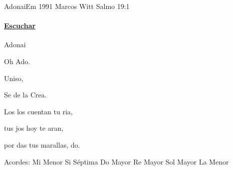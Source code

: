 \documentclass[12pt, spanish]{book}
\newcommand{\NotCCLIed}{\relax}
\begin{document}
    \begin{song}{Adonai}{Em}
    {1991} %
    {Marcos Witt}
    {Salmo 19:1} %
    {} %
        \ifChordBk
        \paragraph{\mbox{}\hfill\protect\href{https://open.spotify.com/intl-es/track/30njp3rQZ90oJTPoQj4RLt}{Escuchar}\mbox{}\hfill}
        \fi


        \begin{SBChorus}
             Adonai

            Oh Ado.

              Uniso,

            Se de la Crea.
        \end{SBChorus}

        \begin{SBOpGroup}
            Los los cuentan tu ria,

            tus jos hoy te aran,

            por das tus marallas, do.
        \end{SBOpGroup}

        \ifChordBk
        \begin{SBOpGroup}
            Acordes:
            \upchord{\Em}\qquad Mi Menor \hfill
            \upchord{\Bseven}\qquad Si S\'eptima \hfill\null\break
            \upchord{\C}\qquad Do Mayor \hfill
            \upchord{\D}Re Mayor \hfill\null\break
            \upchord{\G}\qquad Sol Mayor \hfill
            \upchord{\Am}\qquad La Menor \hfill\null\break
        \end{SBOpGroup}
        \fi
    \end{song}
\end{document}
